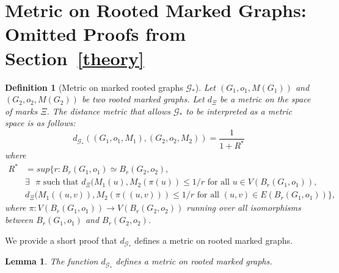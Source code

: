 \documentclass[10pt]{amsart}
\newtheorem{lemma}[theorem]{Lemma}
\newtheorem{definition}[theorem]{Definition}
\begin{document}
\section{Metric on Rooted Marked Graphs: Omitted Proofs from Section~\ref{theory}} \label{metric-proof}
\begin{definition}[Metric on marked rooted graphs $\mathscr{G}_*$] \label{metric} 
Let $(G_1,o_1, M(G_1))$ and $(G_2,o_2, M(G_2))$ be two rooted marked graphs. Let $d_\Xi$ be a metric on the space of marks $\Xi$.  The distance metric that allows $\mathscr{G}_*$ to be interpreted as a metric space is as follows:
\begin{equation*}
    d_{\mathscr{G}_*}((G_1,o_1, M_1), (G_2,o_2, M_2)) = \frac{1}{1 + R^*}
\end{equation*}
where 
\begin{align*}
    R^* &= sup\{r: B_r(G_1, o_1) \simeq B_r(G_2, o_2), \\ &\exists \text{ } \pi \text{ such that } d_\Xi(M_1(u),M_2(\pi(u))\leq 1/r \text{ for all } u \in V(B_r(G_1, o_1)), \\ &d_\Xi(M_1((u, v)), M_2(\pi((u, v)))\leq 1/r \text{ for all } (u, v) \in E(B_r(G_1, o_1))\},
\end{align*}
where $\pi: V(B_r(G_1, o_1))\to V(B_r(G_2, o_2))$ running over all isomorphisms between $B_r(G_1, o_1)$ and $B_r(G_2, o_2)$. 
\end{definition}

We provide a short proof that $d_{\mathscr{G}_*}$ defines a metric on rooted marked graphs. 

\begin{lemma}
The function $d_{\mathscr{G}_*}$ defines a metric on rooted marked graphs.
\end{lemma}
\end{document}
